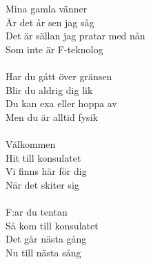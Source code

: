 \documentclass[a6paper, 10pt, twoside]{article}
\begin{document}
\begin{lyrics}
Mina gamla vänner\\
Är det år sen jag såg\\
Det är sällan jag pratar med nån\\
Som inte är F-teknolog\\
\vspace{2pt}\\
Har du gått över gränsen\\
Blir du aldrig dig lik\\
Du kan exa eller hoppa av\\
Men du är alltid fysik\\
\vspace{2pt}\\
Välkommen\\
Hit till konsulatet\\
Vi finns här för dig\\
När det skiter sig\\
\vspace{2pt}\\
F:ar du tentan\\
Så kom till konsulatet\\
Det går nästa gång\\
Nu till nästa sång\\
\end{lyrics}

\end{document}

